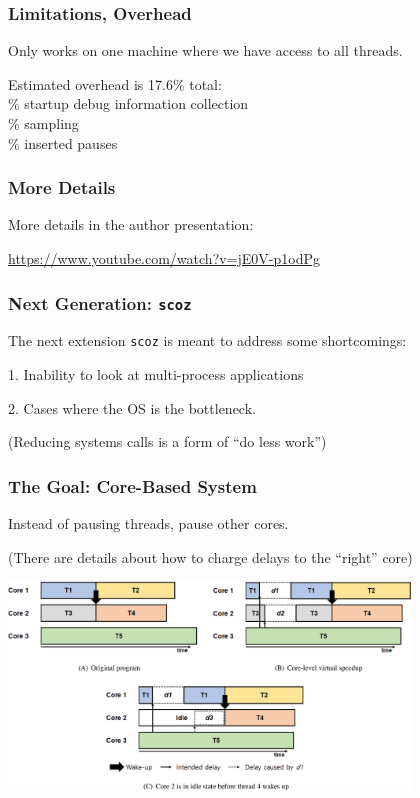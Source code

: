 \begin{frame}
\frametitle{Limitations, Overhead}

Only works on one machine where we have access to all threads.

Estimated overhead is 17.6\% total:\\
\% startup debug information collection\\
\% sampling\\
\% inserted pauses

\end{frame}


\begin{frame}
\frametitle{More Details}

More details in the author presentation:

\url{https://www.youtube.com/watch?v=jE0V-p1odPg}

\end{frame}

\begin{frame}
\frametitle{Next Generation: \texttt{scoz}}
The next extension \texttt{scoz} is meant to address some shortcomings:

1. Inability to look at multi-process applications

2. Cases where the OS is the bottleneck.


(Reducing systems calls is a form of ``do less work'')

\end{frame}

\begin{frame}
\frametitle{The Goal: Core-Based System}

Instead of pausing threads, pause other cores.

(There are details about how to charge delays to the ``right'' core)

\begin{center}
	\includegraphics[width=0.8\textwidth]{images/scoz-delay.jpg}
\end{center}

\end{frame}

